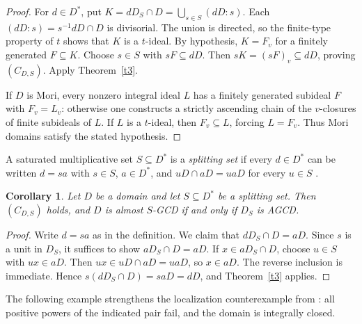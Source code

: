 \documentclass[11pt]{amsart}
\newtheorem{corollary}[theorem]{Corollary}
\theoremstyle{definition}
\theoremstyle{remark}
\begin{document}
\begin{proof}
For $d\in D^\ast$, put
$K=dD_S\cap D=\bigcup_{s\in S}(dD:s)$.
Each $(dD:s)=s^{-1}dD\cap D$ is divisorial. The union is directed,
so the finite-type property of $t$ shows that $K$ is a $t$-ideal.
By hypothesis, $K=F_v$ for a finitely generated $F\subseteq K$.
Choose $s\in S$ with $sF\subseteq dD$. Then
$sK=(sF)_v\subseteq dD$, proving $(C_{D,S})$.
Apply Theorem~\ref{t3}.

If $D$ is Mori, every nonzero integral ideal $L$ has a finitely
generated subideal $F$ with $F_v=L_v$: otherwise one constructs
a strictly ascending chain of the $v$-closures of finite subideals
of $L$. If $L$ is a $t$-ideal, then $F_v\subseteq L$, forcing
$L=F_v$. Thus Mori domains satisfy the stated hypothesis.
\end{proof}

A saturated multiplicative set $S\subseteq D^\ast$ is a
\emph{splitting set} if every $d\in D^\ast$ can be written
$d=sa$ with $s\in S$, $a\in D^\ast$, and
$uD\cap aD=uaD$ for every $u\in S$ \cite{AAZ}.

\begin{corollary}\label{c:splitting-localization-criterion}
Let $D$ be a domain and let $S\subseteq D^\ast$ be a splitting
set. Then $(C_{D,S})$ holds, and $D$ is almost $S$-GCD if and
only if $D_S$ is AGCD.
\end{corollary}

\begin{proof}
Write $d=sa$ as in the definition. We claim that
$dD_S\cap D=aD$. Since $s$ is a unit in $D_S$, it suffices to
show $aD_S\cap D=aD$. If $x\in aD_S\cap D$, choose $u\in S$
with $ux\in aD$. Then $ux\in uD\cap aD=uaD$, so $x\in aD$.
The reverse inclusion is immediate. Hence
$s(dD_S\cap D)=saD=dD$, and Theorem~\ref{t3} applies.
\end{proof}

The following example strengthens the localization counterexample
from \cite[Example~2.2]{AHZ}: all positive powers of the indicated
pair fail, and the domain is integrally closed.
\end{document}
